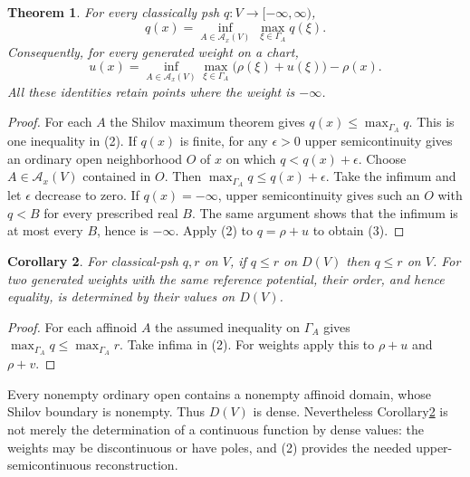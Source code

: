 \documentclass[11pt]{article}
\newtheorem{theorem}{Theorem}
\newtheorem{corollary}[theorem]{Corollary}
\begin{document}
\begin{theorem}\label{reconstruction}
For every classically psh $q:V\to[-\infty,\infty)$,
\[
 q(x)=\inf_{A\in\mathcal A_x(V)}\ \max_{\xi\in\Gamma_A}q(\xi).
 \tag{2}
\]
Consequently, for every generated weight on a chart,
\[
 u(x)=\inf_{A\in\mathcal A_x(V)}
       \max_{\xi\in\Gamma_A}\bigl(\rho(\xi)+u(\xi)\bigr)-\rho(x).
 \tag{3}
\]
All these identities retain points where the weight is $-\infty$.
\end{theorem}
\begin{proof}
For each $A$ the Shilov maximum theorem gives
$q(x)\le\max_{\Gamma_A}q$. This is one inequality in (2).
If $q(x)$ is finite, for any $\epsilon>0$ upper semicontinuity gives an
ordinary open neighborhood $O$ of $x$ on which $q<q(x)+\epsilon$.
Choose $A\in\mathcal A_x(V)$ contained in $O$. Then
$\max_{\Gamma_A}q\le q(x)+\epsilon$.
Take the infimum and let $\epsilon$ decrease to zero.
If $q(x)=-\infty$, upper semicontinuity gives such an $O$ with
$q<B$ for every prescribed real $B$. The same argument shows that the
infimum is at most every $B$, hence is $-\infty$.
Apply (2) to $q=\rho+u$ to obtain (3).
\end{proof}

\begin{corollary}\label{order}
For classical-psh $q,r$ on $V$, if $q\le r$ on $D(V)$ then $q\le r$
on $V$. For two generated weights with the same reference potential,
their order, and hence equality, is determined by their values on
$D(V)$.
\end{corollary}
\begin{proof}
For each affinoid $A$ the assumed inequality on $\Gamma_A$ gives
$\max_{\Gamma_A}q\le\max_{\Gamma_A}r$.
Take infima in (2). For weights apply this to $\rho+u$ and $\rho+v$.
\end{proof}
Every nonempty ordinary open contains a nonempty affinoid domain, whose
Shilov boundary is nonempty. Thus $D(V)$ is dense. Nevertheless
Corollary\ref{order} is not merely the determination of a continuous
function by dense values: the weights may be discontinuous or have poles,
and (2) provides the needed upper-semicontinuous reconstruction.
\end{document}
